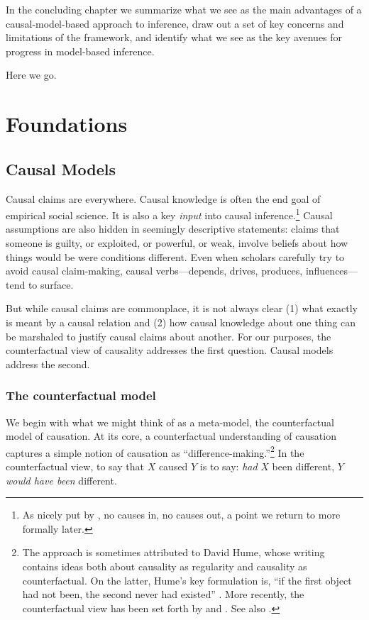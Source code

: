 \documentclass[
  12pt,
]{book}
\begin{document}
In the concluding chapter we summarize what we see as the main advantages of a causal-model-based approach to inference, draw out a set of key concerns and limitations of the framework, and identify what we see as the key avenues for progress in model-based inference.

Here we go.

\hypertarget{part-foundations}{%
\part{Foundations}\label{part-foundations}}

\hypertarget{models}{%
\chapter{Causal Models}\label{models}}

Causal claims are everywhere. Causal knowledge is often the end goal of empirical social science. It is also a key \emph{input} into causal inference.\footnote{As nicely put by \citet{cartwright1994nature}, no causes in, no causes out, a point we return to more formally later.}
Causal assumptions are also hidden in seemingly descriptive statements: claims that someone is guilty, or exploited, or powerful, or weak, involve beliefs about how things would be were conditions different. Even when scholars carefully try to avoid causal claim-making, causal verbs---depends, drives, produces, influences---tend to surface.

But while causal claims are commonplace, it is not always clear (1) what exactly is meant by a causal relation and (2) how causal knowledge about one thing can be marshaled to justify causal claims about another. For our purposes, the counterfactual view of causality addresses the first question. Causal models address the second.

\hypertarget{counterfactualmodel}{%
\section{The counterfactual model}\label{counterfactualmodel}}

We begin with what we might think of as a meta-model, the counterfactual model of causation.
At its core, a counterfactual understanding of causation captures a simple notion of causation as ``difference-making.''\footnote{The approach is sometimes attributed to David Hume, whose writing contains ideas both about causality as regularity and causality as counterfactual. On the latter, Hume's key formulation is, ``if the first object had not been, the second never had existed'' \citep[Section VIII]{hume2000enquiry}. More recently, the counterfactual view has been set forth by \citet{splawa1990application} and \citet{lewis1973counterfactuals}. See also \citet{lewis1986causation}.} In the counterfactual view, to say that \(X\) caused \(Y\) is to say: \emph{had} \(X\) been different, \(Y\) \emph{would have been} different.
\end{document}
